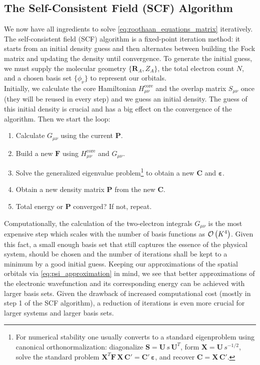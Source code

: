\subsection{The Self-Consistent Field (SCF) Algorithm}
\label{subsec:background_hf_scf}
We now have all ingredients to solve \autoref{eq:roothaan_equations_matrix} iteratively. The self-consistent field (SCF) algorithm is a fixed-point iteration method: it starts from an initial density guess and then alternates between building the Fock matrix and updating the density until convergence. To generate the initial guess, we must supply the molecular geometry $\{\mathbf R_A, Z_A\}$, the total electron count $N$, and a chosen basis set $\{\phi_\nu\}$ to represent our orbitals.\\

Initially, we calculate the core Hamiltonian $H_{\mu\nu}^\text{core}$ and the overlap matrix $S_{\mu\nu}$ once (they will be reused in every step) and we guess an initial density. The guess of this initial density is crucial and has a big effect on the convergence of the algorithm. Then we start the loop: 
\begin{enumerate}[itemsep=0.1em]
    \item Calculate $G_{\mu\nu}$ using the current $\mathbf{P}$.
    \item Build a new $\mathbf{F}$ using $H_{\mu\nu}^\text{core}$ and $G_{\mu\nu}$.
    \item Solve the generalized eigenvalue problem\footnote{For numerical stability one usually converts to a standard eigenproblem using canonical orthonormalization: diagonalize $\mathbf{S}=\mathbf{U}\,s\,\mathbf{U}^T$, form $\mathbf{X}=\mathbf{U}\,s^{-1/2}$, solve the standard problem $\mathbf{X}^T\mathbf{F}\,\mathbf{X}\,\mathbf{C}'=\mathbf{C}'\,\boldsymbol{\varepsilon}$, and recover $\mathbf{C}=\mathbf{X}\,\mathbf{C}'$.} to obtain a new $\mathbf{C}$ and $\boldsymbol{\varepsilon}$. 
    \item Obtain a new density matrix $\mathbf{P}$ from the new $\mathbf{C}$.
    \item Total energy or $\mathbf{P}$ converged? If not, repeat.
\end{enumerate}

Computationally, the calculation of the two-electron integrals $G_{\mu\nu}$ is the most expensive step which scales with the number of basis functions as $\mathcal{O}\left(K^4\right)$. Given this fact, a small enough basis set that still captures the essence of the physical system, should be chosen and the number of iterations shall be kept to a minimum by a good initial guess. Keeping our approximations of the spatial orbitals via \autoref{eq:psi_approximation} in mind, we see that better approximations of the electronic wavefunction and its corresponding energy can be achieved with larger basis sets. Given the drawback of increased computational cost (mostly in step 1 of the SCF algorithm), a reduction of iterations is even more crucial for larger systems and larger basis sets.
